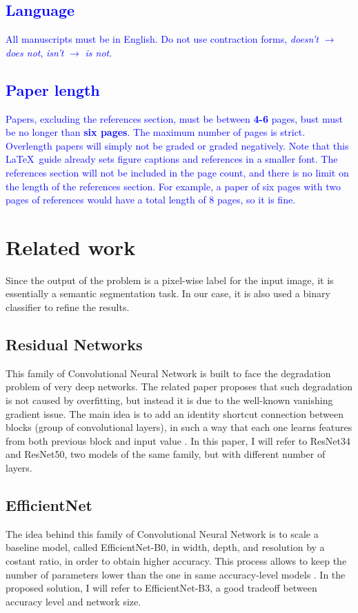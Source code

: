 \documentclass[10pt,twocolumn,letterpaper]{article}
\begin{document}
   \textcolor{blue}{
   \subsection{Language}
      All manuscripts must be in English. Do not use contraction forms, \eg \emph{doesn't} $\xrightarrow{}$ \emph{does not}, \emph{isn't} $\xrightarrow{}$ \emph{is not}. }

   \textcolor{blue}{
   \subsection{Paper length}
      Papers, excluding the references section, must be between \textbf{4-6} pages, bust must be no longer than \textbf{six pages}. The maximum number of pages is strict. Overlength papers will simply not be graded or graded negatively. Note that this \LaTeX\ guide already sets figure captions and references in a smaller font.
      The references section will not be included in the page count, and there is no limit on the length of the references section. For example, a paper of six pages with two pages of references would have a total length of 8 pages, so it is fine.}



\section{Related work}
   Since the output of the problem is a pixel-wise label for the input image, it is essentially a semantic segmentation task. In our case, it is also used a binary classifier to refine the results.
   \subsection{Residual Networks} 
      This family of Convolutional Neural Network is built to face the degradation problem of very deep networks. The related paper proposes that such degradation is not caused by overfitting, but instead it is due to the well-known vanishing gradient issue. The main idea is to add an identity shortcut connection between blocks (group of convolutional layers), in such a way that each one learns features from both previous block and input value \cite{resnet}.
      In this paper, I will refer to ResNet34 and ResNet50, two models of the same family, but with different number of layers.
   \subsection{EfficientNet}
      The idea behind this family of Convolutional Neural Network is to scale a baseline model, called EfficientNet-B0, in width, depth, and resolution by a costant ratio, in order to obtain higher accuracy. This process allows to keep the number of parameters lower than the one in same accuracy-level models \cite{efficientnet}. In the proposed solution, I will refer to EfficientNet-B3, a good tradeoff between accuracy level and network size.
\end{document}
